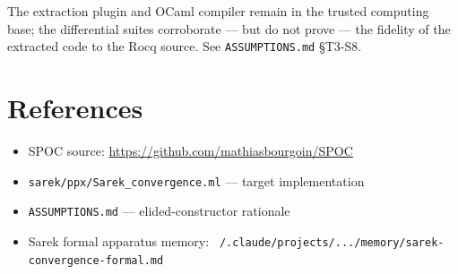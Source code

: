 \documentclass[11pt,a4paper]{article}
\theoremstyle{definition}
\theoremstyle{plain}
\theoremstyle{remark}
\begin{document}
The extraction plugin and OCaml compiler remain in the trusted computing base;
the differential suites corroborate --- but do not prove --- the fidelity of the
extracted code to the Rocq source.  See \texttt{ASSUMPTIONS.md} \S T3-S8.

\section{References}
\label{sec:references}

\begin{itemize}
  \item SPOC source: \url{https://github.com/mathiasbourgoin/SPOC}
  \item \texttt{sarek/ppx/Sarek\_convergence.ml} --- target implementation
  \item \texttt{ASSUMPTIONS.md} --- elided-constructor rationale
  \item Sarek formal apparatus memory: \texttt{~/.claude/projects/.../memory/sarek-convergence-formal.md}
\end{itemize}
\end{document}
